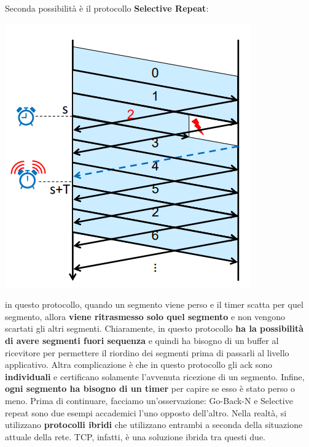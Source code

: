 \documentclass[12pt]{article}
\begin{document}
Seconda possibilità è il protocollo \textbf{Selective Repeat}:
\begin{center}
    \includegraphics[width = 0.40\linewidth]{Images/55.png}
\end{center}
in questo protocollo, quando un segmento viene perso e il timer scatta per quel segmento, allora \textbf{viene ritrasmesso solo quel segmento} e non vengono
scartati gli altri segmenti. Chiaramente, in questo protocollo \textbf{ha la possibilità di avere segmenti fuori sequenza} e quindi ha bisogno di un buffer al
ricevitore per permettere il riordino dei segmenti prima di passarli al livello applicativo. Altra complicazione è che in questo protocollo gli ack sono \textbf{individuali}
e certificano solamente l'avvenuta ricezione di un segmento. Infine, \textbf{ogni segmento ha bisogno di un timer} per capire se esso è stato perso o meno.
Prima di continuare, facciamo un'osservazione: Go-Back-N e Selective repeat sono due esempi accademici l'uno opposto dell'altro. Nella realtà, si utilizzano \textbf{protocolli ibridi}
che utilizzano entrambi a seconda della situazione attuale della rete. TCP, infatti, è una soluzione ibrida tra questi due.
\end{document}
